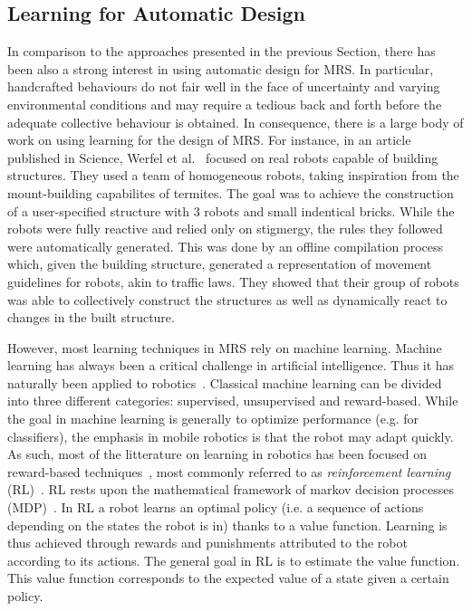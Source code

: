   \subsection{Learning for Automatic Design}

    In comparison to the approaches presented in the previous Section, there has been also a strong interest in using automatic design for MRS. In particular, handcrafted behaviours do not fair well in the face of uncertainty and varying environmental conditions and may require a tedious back and forth before the adequate collective behaviour is obtained. In consequence, there is a large body of work on using learning for the design of MRS. For instance, in an article published in Science, Werfel et al.~\parencite{Werfel2014} focused on real robots capable of building structures. They used a team of homogeneous robots, taking inspiration from the mount-building capabilites of termites. The goal was to achieve the construction of a user-specified structure with $3$ robots and small indentical bricks. While the robots were fully reactive and relied only on stigmergy, the rules they followed were automatically generated. This was done by an offline compilation process which, given the building structure, generated a representation of movement guidelines for robots, akin to traffic laws. They showed that their group of robots was able to collectively construct the structures as well as dynamically react to changes in the built structure.

    However, most learning techniques in MRS rely on machine learning. Machine learning has always been a critical challenge in artificial intelligence. Thus it has naturally been applied to robotics~\parencite{Hertzberg2008}. Classical machine learning can be divided into three different categories: supervised, unsupervised and reward-based. While the goal in machine learning is generally to optimize performance (e.g. for classifiers), the emphasis in mobile robotics is that the robot may adapt quickly. As such, most of the litterature on learning in robotics has been focused on reward-based techniques~\parencite{Mataric2008}, most commonly referred to as \emph{reinforcement learning} (RL)~\parencite{Sutton1998}. RL rests upon the mathematical framework of markov decision processes (MDP)~\parencite{Bellman1957}. In RL a robot learns an optimal policy (i.e. a sequence of actions depending on the states the robot is in) thanks to a value function. Learning is thus achieved through rewards and punishments attributed to the robot according to its actions. The general goal in RL is to estimate the value function. This value function corresponds to the expected value of a state given a certain policy.


